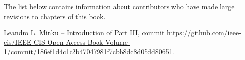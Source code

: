 
\contributors

The list below contains information about contributors who have made large revisions to chapters of this book.

Leandro L. Minku -- Introduction of Part III, commit \url{https://github.com/ieee-cis/IEEE-CIS-Open-Access-Book-Volume-1/commit/186ef1d4c1c2b47047981f7cbb8dc8d05dd80651}.